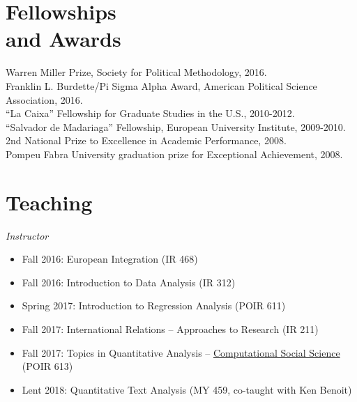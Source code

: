\documentclass[margin,line,11pt]{resume}
\newcommand{\nl}{\vspace{0.10in}\\}
\begin{document}
\begin{resume}
\newpage     

    \section{\mysidestyle Fellowships\\ and Awards}
	Warren Miller Prize, Society for Political Methodology, 2016.\nl
    Franklin L. Burdette/Pi Sigma Alpha Award, American Political Science Association, 2016.\nl
	``La Caixa'' Fellowship for Graduate Studies in the U.S., 2010-2012. \nl
	``Salvador de Madariaga'' Fellowship, European University Institute, 2009-2010. \nl
	 2nd National Prize to Excellence in Academic Performance, 2008. \nl
	Pompeu Fabra University graduation prize for Exceptional Achievement, 2008.


            \section{\mysidestyle Teaching}

\emph{Instructor}
\begin{itemize}
\item Fall 2016: European Integration (IR 468)
\item Fall 2016: Introduction to Data Analysis (IR 312)
\item Spring 2017: Introduction to Regression Analysis (POIR 611)
\item Fall 2017: International Relations -- Approaches to Research (IR 211)
\item Fall 2017: Topics in Quantitative Analysis -- \href{http://pablobarbera.com/POIR613/}{Computational Social Science} (POIR 613)
\item Lent 2018: Quantitative Text Analysis (MY 459, co-taught with Ken Benoit)
\end{itemize}



\end{resume}
\end{document}
